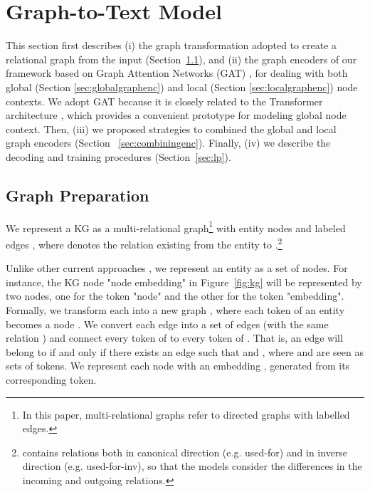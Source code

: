 \documentclass[11pt,a4paper]{article}
\begin{document}
%
 \section{Graph-to-Text Model}
\label{sec:background}



This section first describes (i) the graph transformation adopted to create a relational graph from the input (Section~\ref{sec:graph_preparation}), and (ii) the graph encoders of our framework based on Graph Attention Networks (GAT) \cite{velickovic2018graph}, for dealing with both global (Section \ref{sec:globalgraphenc}) and local (Section \ref{sec:localgraphenc}) node contexts. We adopt GAT because it is closely related to the Transformer architecture \cite{NIPS2017_7181}, which provides a convenient prototype for modeling global node context. Then, (iii) we proposed strategies to combined the global and local graph encoders (Section
~\ref{sec:combiningenc}). Finally, (iv) we describe the decoding and training procedures (Section~\ref{sec:lp}).













\subsection{Graph Preparation}
\label{sec:graph_preparation}
We represent a KG as a multi-relational graph\footnote{In this paper, multi-relational graphs refer to directed graphs with labelled edges.}  with entity nodes  and labeled edges , where  denotes the relation existing from the entity  to .\footnote{ contains relations both in canonical direction (e.g. used-for) and in inverse direction (e.g. used-for-inv), so that the models consider the differences in the incoming and outgoing relations.}


Unlike other current approaches \cite{koncel-kedziorski-etal-2019-text, moryossef-etal-2019-step}, we represent an entity as a set of nodes. For instance, the KG node "node embedding" in Figure~\ref{fig:kg} will be represented by two nodes, one for the token "node" and the other for the token "embedding". Formally, we transform each  into a new graph , where each token of an entity  becomes a node . We convert each edge  into a set of edges (with the same relation ) and connect every token of  to every token of . That is, an edge  will belong to  if and only if there exists an edge  such that  and , where  and  are seen as sets of tokens. We represent each node  with an embedding , generated from its corresponding token.
\end{document}
